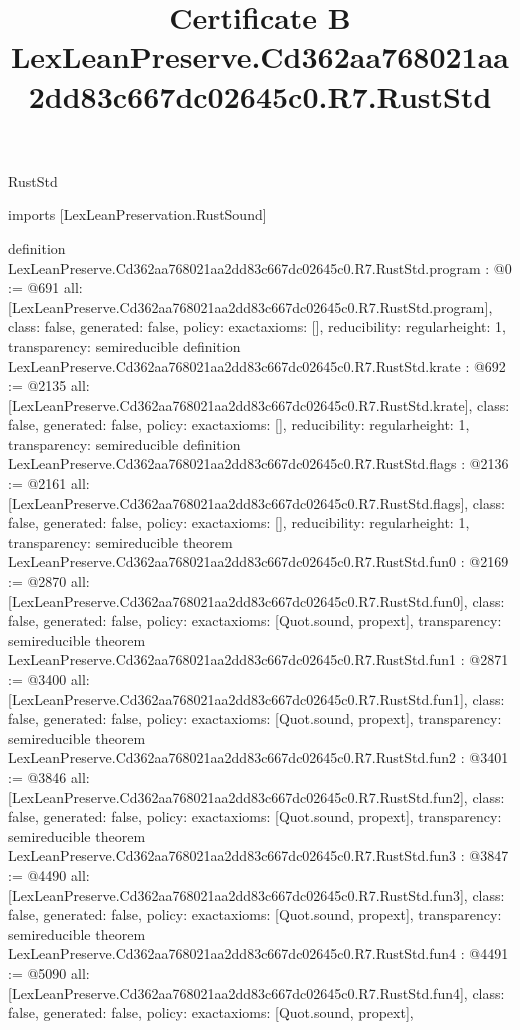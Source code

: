 \begin{lexlean}{RustStd}
\title{Certificate B LexLeanPreserve.Cd362aa768021aa2dd83c667dc02645c0.R7.RustStd}
\begin{coremodule}
imports [LexLeanPreservation.RustSound]

definition LexLeanPreserve.Cd362aa768021aa2dd83c667dc02645c0.R7.RustStd.program : @0 := @691 {
  all: [LexLeanPreserve.Cd362aa768021aa2dd83c667dc02645c0.R7.RustStd.program],
  class: false,
  generated: false,
  policy: exact{axioms: []},
  reducibility: regular{height: 1},
  transparency: semireducible
}
definition LexLeanPreserve.Cd362aa768021aa2dd83c667dc02645c0.R7.RustStd.krate : @692 := @2135 {
  all: [LexLeanPreserve.Cd362aa768021aa2dd83c667dc02645c0.R7.RustStd.krate],
  class: false,
  generated: false,
  policy: exact{axioms: []},
  reducibility: regular{height: 1},
  transparency: semireducible
}
definition LexLeanPreserve.Cd362aa768021aa2dd83c667dc02645c0.R7.RustStd.flags : @2136 := @2161 {
  all: [LexLeanPreserve.Cd362aa768021aa2dd83c667dc02645c0.R7.RustStd.flags],
  class: false,
  generated: false,
  policy: exact{axioms: []},
  reducibility: regular{height: 1},
  transparency: semireducible
}
theorem LexLeanPreserve.Cd362aa768021aa2dd83c667dc02645c0.R7.RustStd.fun0 : @2169 := @2870 {
  all: [LexLeanPreserve.Cd362aa768021aa2dd83c667dc02645c0.R7.RustStd.fun0],
  class: false,
  generated: false,
  policy: exact{axioms: [Quot.sound, propext]},
  transparency: semireducible
}
theorem LexLeanPreserve.Cd362aa768021aa2dd83c667dc02645c0.R7.RustStd.fun1 : @2871 := @3400 {
  all: [LexLeanPreserve.Cd362aa768021aa2dd83c667dc02645c0.R7.RustStd.fun1],
  class: false,
  generated: false,
  policy: exact{axioms: [Quot.sound, propext]},
  transparency: semireducible
}
theorem LexLeanPreserve.Cd362aa768021aa2dd83c667dc02645c0.R7.RustStd.fun2 : @3401 := @3846 {
  all: [LexLeanPreserve.Cd362aa768021aa2dd83c667dc02645c0.R7.RustStd.fun2],
  class: false,
  generated: false,
  policy: exact{axioms: [Quot.sound, propext]},
  transparency: semireducible
}
theorem LexLeanPreserve.Cd362aa768021aa2dd83c667dc02645c0.R7.RustStd.fun3 : @3847 := @4490 {
  all: [LexLeanPreserve.Cd362aa768021aa2dd83c667dc02645c0.R7.RustStd.fun3],
  class: false,
  generated: false,
  policy: exact{axioms: [Quot.sound, propext]},
  transparency: semireducible
}
theorem LexLeanPreserve.Cd362aa768021aa2dd83c667dc02645c0.R7.RustStd.fun4 : @4491 := @5090 {
  all: [LexLeanPreserve.Cd362aa768021aa2dd83c667dc02645c0.R7.RustStd.fun4],
  class: false,
  generated: false,
  policy: exact{axioms: [Quot.sound, propext]},
}
\end{coremodule}
\end{lexlean}
